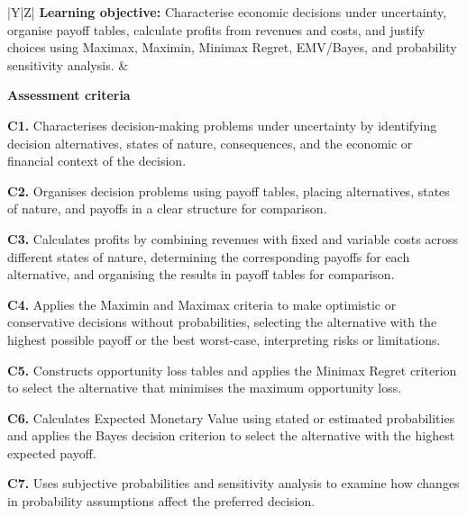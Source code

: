 \noindent
\begin{tabular}{|Y|Z|}\hline
{\small\textbf{Learning objective:} Characterise economic decisions under uncertainty, organise payoff tables, calculate profits from revenues and costs, and justify choices using Maximax, Maximin, Minimax Regret, EMV/Bayes, and probability sensitivity analysis.}
&
{\footnotesize\textbf{Assessment criteria}\par
	\textbf{C1.} Characterises decision-making problems under uncertainty by identifying decision alternatives, states of nature, consequences, and the economic or financial context of the decision.\par
	\textbf{C2.} Organises decision problems using payoff tables, placing alternatives, states of nature, and payoffs in a clear structure for comparison.\par
	\textbf{C3.} Calculates profits by combining revenues with fixed and variable costs across different states of nature, determining the corresponding payoffs for each alternative, and organising the results in payoff tables for comparison.\par
	\textbf{C4.} Applies the Maximin and Maximax criteria to make optimistic or conservative decisions without probabilities, selecting the alternative with the highest possible payoff or the best worst-case, interpreting risks or limitations.\par
	\textbf{C5.} Constructs opportunity loss tables and applies the Minimax Regret criterion to select the alternative that minimises the maximum opportunity loss.\par
	\textbf{C6.} Calculates Expected Monetary Value using stated or estimated probabilities and applies the Bayes decision criterion to select the alternative with the highest expected payoff.\par
	\textbf{C7.} Uses subjective probabilities and sensitivity analysis to examine how changes in probability assumptions affect the preferred decision.}\\\hline
\end{tabular}

\StudentInfo \vspace{-3mm}


